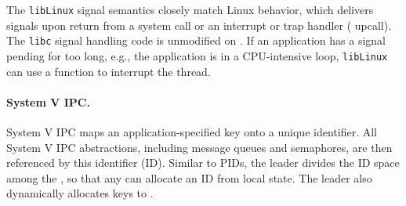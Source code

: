 The \graphene{} {\tt libLinux} signal semantics closely match Linux behavior, which
delivers signals upon return from a system call or an interrupt or trap handler (\pal{} upcall).
The {\tt libc} signal handling code is unmodified on \graphene{}.
If an application has a signal pending for too long,
e.g., the application is in a CPU-intensive loop, {\tt libLinux} can use a \pal{} function to interrupt 
the thread. 




\begin{comment}
\graphene{} internally indexes point-to-point handles using PIDs.
In order to facilitate reallocation of PIDs without global coordination, 
\graphene{}-internal PIDs also include a {\em generation number},
allowing \picoprocs{} to lazily detect reuse similar to generation numbers 
for inodes in NFS~\cite{sandberg85nfs}.
\end{comment}

\paragraph{System V IPC.} System V IPC
maps an application-specified key onto a unique identifier.
All System V IPC abstractions, including message queues and semaphores,
are then referenced by this identifier (ID).
Similar to PIDs, 
the leader divides the ID space among the \picoprocs{}, so that any \picoproc{}
can allocate an ID from local state. %
The leader also dynamically allocates keys to \picoprocs{}.

